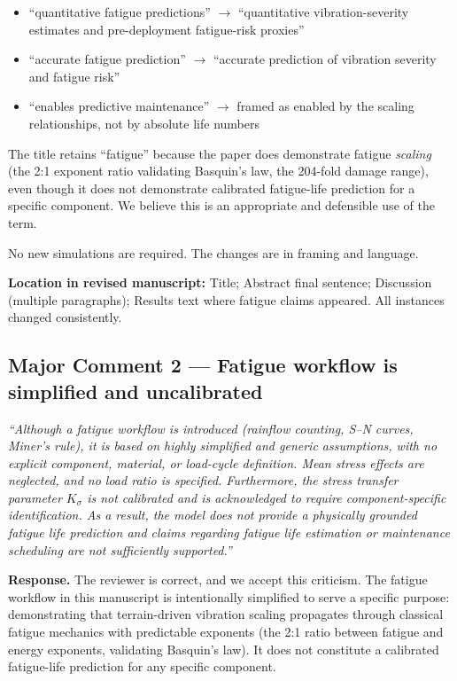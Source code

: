 \documentclass[11pt]{article}
\newcommand{\revquote}[1]{\medskip\noindent\textit{``#1''}\medskip}
\newcommand{\revloc}[1]{\noindent\textbf{Location in revised manuscript:} #1\medskip}
\begin{document}
\begin{itemize}[leftmargin=*]
\item ``quantitative fatigue predictions'' $\rightarrow$ ``quantitative vibration-severity estimates and pre-deployment fatigue-risk proxies''
\item ``accurate fatigue prediction'' $\rightarrow$ ``accurate prediction of vibration severity and fatigue risk''
\item ``enables predictive maintenance'' $\rightarrow$ framed as enabled by the scaling relationships, not by absolute life numbers
\end{itemize}

\noindent The title retains ``fatigue'' because the paper does demonstrate fatigue \emph{scaling} (the 2:1 exponent ratio validating Basquin's law, the 204-fold damage range), even though it does not demonstrate calibrated fatigue-life prediction for a specific component. We believe this is an appropriate and defensible use of the term.

No new simulations are required. The changes are in framing and language.

\revloc{Title; Abstract final sentence; Discussion (multiple paragraphs); Results text where fatigue claims appeared. All instances changed consistently.}

\bigskip

\subsection*{Major Comment 2 --- Fatigue workflow is simplified and uncalibrated}

\revquote{Although a fatigue workflow is introduced (rainflow counting, S--N curves, Miner's rule), it is based on highly simplified and generic assumptions, with no explicit component, material, or load-cycle definition. Mean stress effects are neglected, and no load ratio is specified. Furthermore, the stress transfer parameter $K_\sigma$ is not calibrated and is acknowledged to require component-specific identification. As a result, the model does not provide a physically grounded fatigue life prediction and claims regarding fatigue life estimation or maintenance scheduling are not sufficiently supported.}

\noindent\textbf{Response.} The reviewer is correct, and we accept this criticism. The fatigue workflow in this manuscript is intentionally simplified to serve a specific purpose: demonstrating that terrain-driven vibration scaling propagates through classical fatigue mechanics with predictable exponents (the 2:1 ratio between fatigue and energy exponents, validating Basquin's law). It does not constitute a calibrated fatigue-life prediction for any specific component.
\end{document}
